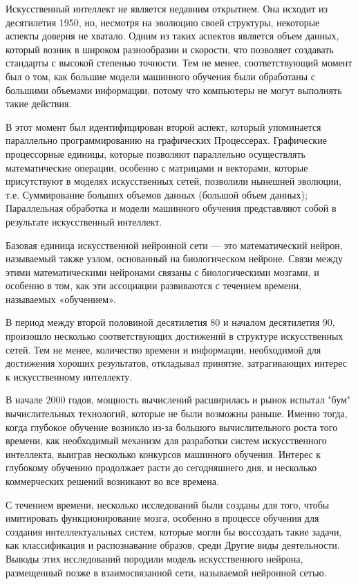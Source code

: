 Искусственный интеллект не является недавним открытием. Она исходит из десятилетия 1950, но, несмотря на эволюцию своей структуры, некоторые аспекты доверия не хватало. Одним из таких аспектов является объем данных, который возник в широком разнообразии и скорости, что позволяет создавать стандарты с высокой степенью точности. Тем не менее, соответствующий момент был о том, как большие модели машинного обучения были обработаны с большими объемами информации, потому что компьютеры не могут выполнять такие действия.

В этот момент был идентифицирован второй аспект, который упоминается параллельно программированию на графических Процессерах. Графические процессорные единицы, которые позволяют параллельно осуществлять математические операции, особенно с матрицами и векторами, которые присутствуют в моделях искусственных сетей, позволили нынешней эволюции, т.е. Суммирование больших объемов данных (большой объем данных); Параллельная обработка и модели машинного обучения представляют собой в результате искусственный интеллект.

Базовая единица искусственной нейронной сети — это математический нейрон, называемый также узлом, основанный на биологическом нейроне. Связи между этими математическими нейронами связаны с биологическими мозгами, и особенно в том, как эти ассоциации развиваются с течением времени, называемых «обучением».

В период между второй половиной десятилетия 80 и началом десятилетия 90, произошло несколько соответствующих достижений в структуре искусственных сетей. Тем не менее, количество времени и информации, необходимой для достижения хороших результатов, откладывал принятие, затрагивающих интерес к искусственному интеллекту.

В начале 2000 годов, мощность вычислений расширилась и рынок испытал "бум" вычислительных технологий, которые не были возможны раньше. Именно тогда, когда глубокое обучение возникло из-за большого вычислительного роста того времени, как необходимый механизм для разработки систем искусственного интеллекта, выиграв несколько конкурсов машинного обучения. Интерес к глубокому обучению продолжает расти до сегодняшнего дня, и несколько коммерческих решений возникают во все времена.

С течением времени, несколько исследований были созданы для того, чтобы имитировать функционирование мозга, особенно в процессе обучения для создания интеллектуальных систем, которые могли бы воссоздать такие задачи, как классификация и распознавание образов, среди Другие виды деятельности. Выводы этих исследований породили модель искусственного нейрона, размещенный позже в взаимосвязанной сети, называемой нейронной сетью.

